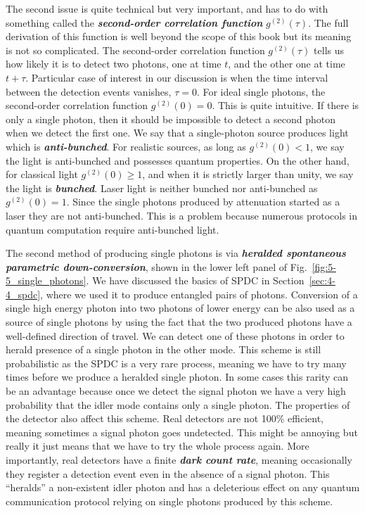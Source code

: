 The second issue is quite technical but very important, and has to do with something called the \textbf{\emph{second-order correlation function}} $g^{(2)}(\tau)$.
The full derivation of this function is well beyond the scope of this book but its meaning is not so complicated.
The second-order correlation function $g^{(2)}(\tau)$ tells us how likely it is to detect two photons, one at time $t$, and the other one at time $t+\tau$.
Particular case of interest in our discussion is when the time interval between the detection events vanishes, $\tau = 0$.
For ideal single photons, the second-order correlation function $g^{(2)}(0) = 0$.
This is quite intuitive.
If there is only a single photon, then it should be impossible to detect a second photon when we detect the first one.
We say that a single-photon source produces light which is \textbf{\emph{anti-bunched}}.
For realistic sources, as long as $g^{(2)}(0) < 1$, we say the light is anti-bunched and possesses quantum properties.
On the other hand, for classical light $g^{(2)}(0) \geq 1$, and when it is strictly larger than unity, we say the light is \textbf{\emph{bunched}}.
Laser light is neither bunched nor anti-bunched as $g^{(2)}(0)=1$.
Since the single photons produced by attenuation started as a laser they are not anti-bunched.
This is a problem because numerous protocols in quantum computation require anti-bunched light.

The second method of producing single photons is via \textbf{\emph{heralded spontaneous parametric down-conversion}}, shown in the lower left panel of Fig.~\ref{fig:5-5_single_photons}.
We have discussed the basics of SPDC in Section~\ref{sec:4-4_spdc}, where we used it to produce entangled pairs of photons.
Conversion of a single high energy photon into two photons of lower energy can be also used as a source of single photons by using the fact that the two produced photons have a well-defined direction of travel.
We can detect one of these photons in order to herald presence of a single photon in the other mode.
This scheme is still probabilistic as the SPDC is a very rare process, meaning we have to try many times before we produce a heralded single photon.
In some cases this rarity can be an advantage because once we detect the signal photon we have a very high probability that the idler mode contains only a single photon.
The properties of the detector also affect this scheme.
Real detectors are not 100\% efficient, meaning sometimes a signal photon goes undetected.
This might be annoying but really it just means that we have to try the whole process again.
More importantly, real detectors have a finite \textbf{\emph{dark count rate}}, meaning occasionally they register a detection event even in the absence of a signal photon.
This ``heralds'' a non-existent idler photon and has a deleterious effect on any quantum communication protocol relying on single photons produced by this scheme.

